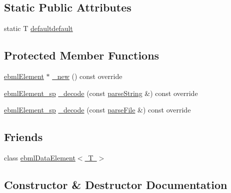 \subsection*{Static Public Attributes}
\begin{DoxyCompactItemize}
\item 
static T \mbox{\hyperlink{classebml_1_1ebmlDataElementClass_aa58b82cbc57d5ba83c54e845cf354bb5}{defaultdefault}}
\end{DoxyCompactItemize}
\subsection*{Protected Member Functions}
\begin{DoxyCompactItemize}
\item 
\mbox{\hyperlink{classebml_1_1ebmlElement}{ebml\+Element}} $\ast$ \mbox{\hyperlink{classebml_1_1ebmlDataElementClass_a79fabffdfd33bee94cd14416646da546}{\+\_\+new}} () const override
\item 
\mbox{\hyperlink{namespaceebml_adad533b7705a16bb360fe56380c5e7be}{ebml\+Element\+\_\+sp}} \mbox{\hyperlink{classebml_1_1ebmlDataElementClass_a481cda6ab9f96ab21434daabd9ad1ed9}{\+\_\+decode}} (const \mbox{\hyperlink{classebml_1_1parseString}{parse\+String}} \&) const override
\item 
\mbox{\hyperlink{namespaceebml_adad533b7705a16bb360fe56380c5e7be}{ebml\+Element\+\_\+sp}} \mbox{\hyperlink{classebml_1_1ebmlDataElementClass_ac0b070ab767aecb9387f9c0e412e8136}{\+\_\+decode}} (const \mbox{\hyperlink{classebml_1_1parseFile}{parse\+File}} \&) const override
\end{DoxyCompactItemize}
\subsection*{Friends}
\begin{DoxyCompactItemize}
\item 
class \mbox{\hyperlink{classebml_1_1ebmlDataElementClass_a817c43c32db8e0094e44cb83006f25ca}{ebml\+Data\+Element$<$ T $>$}}
\end{DoxyCompactItemize}


\subsection{Constructor \& Destructor Documentation}
\mbox{\label{classebml_1_1ebmlDataElementClass_a9fc67c00537acbd8c4e67c62d4e8a877}} 
